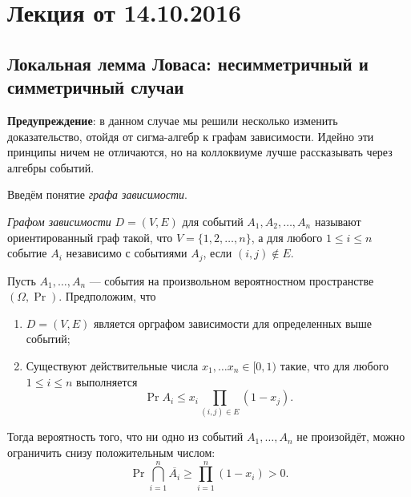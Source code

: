 \section{Лекция от 14.10.2016}

\subsection{Локальная лемма Ловаса: несимметричный и симметричный случаи}
\textbf{Предупреждение}: в данном случае мы решили несколько изменить доказательство, отойдя от сигма-алгебр к графам зависимости. Идейно эти принципы ничем не отличаются, но на коллоквиуме лучше рассказывать через алгебры событий.

Введём понятие \emph{графа зависимости}.

\begin{definition}
    \emph{Графом зависимости} \(D = (V, E)\) для событий \(A_1, A_2, \dots, A_n\) называют ориентированный граф такой, что \(V = \{1, 2, \dots, n\}\), а для любого \(1 \leq i \leq n\) событие \(A_i\) независимо с событиями \(A_j\), если \((i, j) \notin E\).
\end{definition}

\begin{theorem}
    Пусть \(A_1, \dots, A_n\) --- события на произвольном вероятностном пространстве \((\Omega, \Pr)\). Предположим, что
    \begin{enumerate}
        \item \(D = (V, E) \) является орграфом зависимости для определенных выше событий;
        \item Существуют действительные числа \(x_1, \ldots x_n \in [0, 1) \) такие, 
        что для любого \(1 \leq i \leq n\) выполняется \[\Pr{A_i} \leq x_i \prod\limits_{(i, j) \in E} (1 - x_j).\]
    \end{enumerate}
    
    Тогда вероятность того, что ни одно из событий \(A_1, \dots, A_n\) не произойдёт, можно ограничить снизу положительным числом: \[\Pr{\bigcap\limits_{i = 1}^{n}\overline{A_i}} \geq \prod\limits_{i = 1}^{n}(1 - x_i) > 0.\]
\end{theorem}

